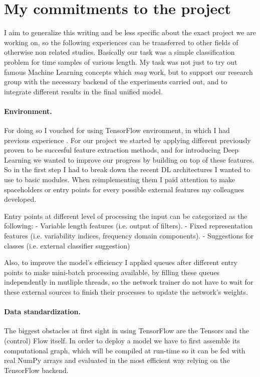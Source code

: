 \section{My commitments to the project}

I aim to generalize this writing and be less specific about the exact project we are working on, so the following experiences can be transferred to other fields of otherwise non related studies.
Basically our task was a simple classification problem for time samples of various length.
My task was not just to try out famous Machine Learning concepts which \textit{may} work, but to support our research group with the necessary backend of the experiments carried out, and to integrate different results in the final unified model.

\paragraph{Environment.}
For doing so I vouched for using TensorFlow environment, in which I had previous experience \cite{github-projects}.
For our project we started by applying different previously proven to be succesful feature extraction methods, and for introducing Deep Learning we wanted to improve our progress by building on top of these features.
So in the first step I had to break down the recent DL architectures I wanted to use to basic modules.
When reimplementing them I paid attention to make spaceholders or entry points for every possible external features my colleagues developed.

Entry points at different level of processing the input can be categorized as the following:
- Variable length features (i.e. output of filters).
- Fixed representation features (i.e. variability indices, frequency domain components).
- Suggestions for classes (i.e. external classifier suggestion)

Also, to improve the model's efficiency I applied queues after different entry points to make mini-batch processing available, by filling these queues independently in mutliple threads, so the network trainer do not have to wait for these external sources to finish their processes to update the network's weights.

\paragraph{Data standardization.}
The biggest obstacles at first sight in using TensorFlow are the Tensors and the (control) Flow itself. In order to deploy a model we have to first assemble its computational graph, which will be compiled at run-time so it can be fed with real NumPy arrays and evaluated in the most efficient way relying on the TensorFlow backend.

